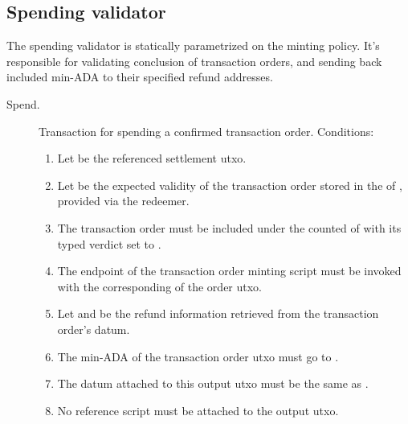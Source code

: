 \documentclass[../midgard.tex]{subfiles}
\begin{document}
\subsection{Spending validator}
\label{h:transaction-order-spending-validator}

The  spending validator is statically parametrized on the  minting policy.
It's responsible for validating conclusion of transaction orders, and sending back included min-ADA to their specified refund addresses.

\begin{description}
  \item[Spend.] Transaction for spending a confirmed transaction order.
    Conditions:
    \begin{enumerate}
      \item Let  be the referenced settlement utxo.
      \item Let  be the expected validity of the transaction order stored in the  of , provided via the redeemer.
      \item The transaction order must be included under the counted  of  with its typed verdict set to .
      \item The  endpoint of the transaction order minting script must be invoked with the corresponding  of the order utxo.
      \item Let  and  be the refund information retrieved from the transaction order's datum.
      \item The min-ADA of the transaction order utxo must go to .
      \item The datum attached to this output utxo must be the same as .
      \item No reference script must be attached to the output utxo.
    \end{enumerate}
\end{description}
\end{document}
